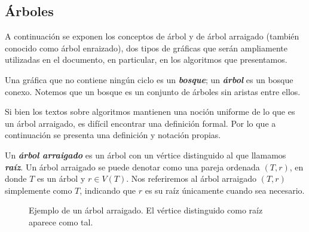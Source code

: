 \subsection{Árboles}

A continuación se exponen los conceptos de árbol y de árbol arraigado (también conocido como árbol enraizado), dos tipos de gráficas que serán ampliamente utilizadas en el documento, en particular, en los algoritmos que presentamos. 

Una gráfica que no contiene ningún ciclo es un \emph{\textbf{bosque}}; un \emph{\textbf{árbol}} es un bosque conexo. Notemos que un bosque es un conjunto de árboles sin aristas entre ellos.

Si bien los textos sobre algoritmos mantienen una noción uniforme de lo que es un árbol arraigado, es difícil encontrar una definición formal. Por lo que a continuación se presenta una definición y notación propias.

Un \textbf{\emph{árbol arraigado}} es un árbol con un vértice distinguido al que llamamos \textbf{\emph{raíz}}. Un árbol arraigado se puede denotar como una pareja ordenada $(T,r)$, en donde $T$ es un árbol y $r \in V(T)$. Nos referiremos al árbol arraigado $(T,r)$ simplemente como $T$, indicando que $r$ es su raíz únicamente cuando sea necesario.

\begin{figure}[!htbp]
\centering
\begin{subfigure}{\textwidth}
\centering
{}
\end{subfigure}
\caption{Ejemplo de un árbol arraigado. El vértice distinguido como raíz aparece como tal.}
\label{fig_ejemplo_arbol}
\end{figure}

